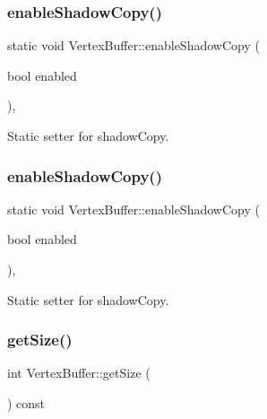 \subsubsection{\texorpdfstring{enable\+Shadow\+Copy()}{enableShadowCopy()}\hspace{0.1cm}{\footnotesize\ttfamily [1/2]}}
{\footnotesize\ttfamily static void Vertex\+Buffer\+::enable\+Shadow\+Copy (\begin{DoxyParamCaption}\item[{bool}]{enabled }\end{DoxyParamCaption})\hspace{0.3cm}{\ttfamily [inline]}, {\ttfamily [static]}}

Static setter for shadow\+Copy. \mbox{\label{classVertexBuffer_a0a7fbf604eae9d67af9c161dcfb129fd}} 
\subsubsection{\texorpdfstring{enable\+Shadow\+Copy()}{enableShadowCopy()}\hspace{0.1cm}{\footnotesize\ttfamily [2/2]}}
{\footnotesize\ttfamily static void Vertex\+Buffer\+::enable\+Shadow\+Copy (\begin{DoxyParamCaption}\item[{bool}]{enabled }\end{DoxyParamCaption})\hspace{0.3cm}{\ttfamily [inline]}, {\ttfamily [static]}}

Static setter for shadow\+Copy. \mbox{\label{classVertexBuffer_a75077b81d0067d0255a48fe608370eb8}} 
\subsubsection{\texorpdfstring{get\+Size()}{getSize()}\hspace{0.1cm}{\footnotesize\ttfamily [1/2]}}
{\footnotesize\ttfamily int Vertex\+Buffer\+::get\+Size (\begin{DoxyParamCaption}{ }\end{DoxyParamCaption}) const}


